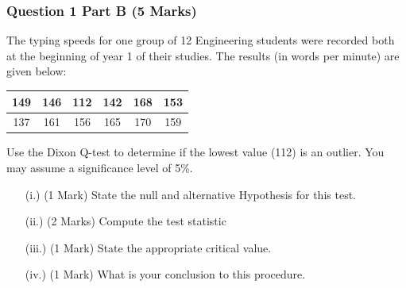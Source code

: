 \documentclass[a4paper,12pt]{article}
\begin{document}
\bigskip

\subsubsection*{Question 1 Part B (5 Marks)}

The typing speeds for one group of 12 Engineering students were recorded both at the beginning of year 1 of their studies. The results (in words per minute) are given below:

\begin{center}
	\begin{tabular}{|c|c|c|c|c|c|}
		\hline
		149  & 146 & 112 & 142 & 168& 153\\ \hline
		137 & 161 & 156& 165&  170&  159
		\\ \hline
	\end{tabular}
\end{center}
Use the Dixon Q-test to determine if the lowest value (112) is an outlier. You may assume a significance level of 5\%.
\begin{itemize}
	\item[(i.)](1 Mark)	State the null and alternative Hypothesis for this test.
	\item[(ii.)](2 Marks) Compute the test statistic
	\item[(iii.)](1 Mark) State the appropriate critical value.
	\item[(iv.)](1 Mark) What is your conclusion to this procedure.
\end{itemize}
\newpage
\end{document}
